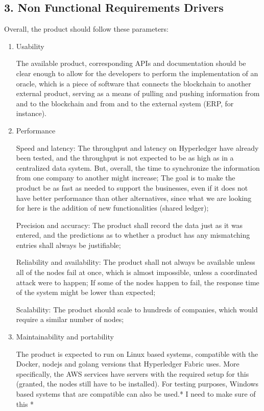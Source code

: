 		

\subsection*{3. Non Functional Requirements Drivers}

Overall, the product should follow these parameters:
\begin{enumerate}
    \item  Usability
		\par The available product, corresponding APIs  and documentation should be clear enough to allow for the developers to perform the implementation of an oracle, which is a piece of software that connects the blockchain to another external product, serving as a means of pulling and pushing information from and to the blockchain and from and to the external system (ERP, for instance).
    \item  Performance
		\par Speed and latency: The throughput and latency on Hyperledger have already been tested, and the throughput is not expected to be as high as in a centralized data system. But, overall, the time to synchronize the information from one company to another might increase; The goal is to make the product be as fast as needed to support the businesses, even if it does not have better performance than other alternatives, since what we are looking for here is the addition of new functionalities (shared ledger);
		\par Precision and accuracy: The product shall record the data just as it was entered, and the predictions as to whether a product has any mismatching entries shall always be justifiable;
		\par Reliability and availability: The product shall not always be available unless all of the nodes fail at once, which is almost impossible, unless a coordinated attack were to happen; If some of the nodes happen to fail, the response time of the system might be lower than expected;
		\par Scalability: The product should scale to hundreds of companies, which would require a similar number of nodes;
    \item  Maintainability and portability
		\par The product is expected to run on Linux based systems, compatible with the Docker, nodejs and golang versions that Hyperledger Fabric uses. More specifically, the AWS services have servers with the required setup for this (granted, the nodes still have to be installed). For testing purposes, Windows based systems that are compatible can also be used.* I need to make sure of this *

\end{enumerate}
